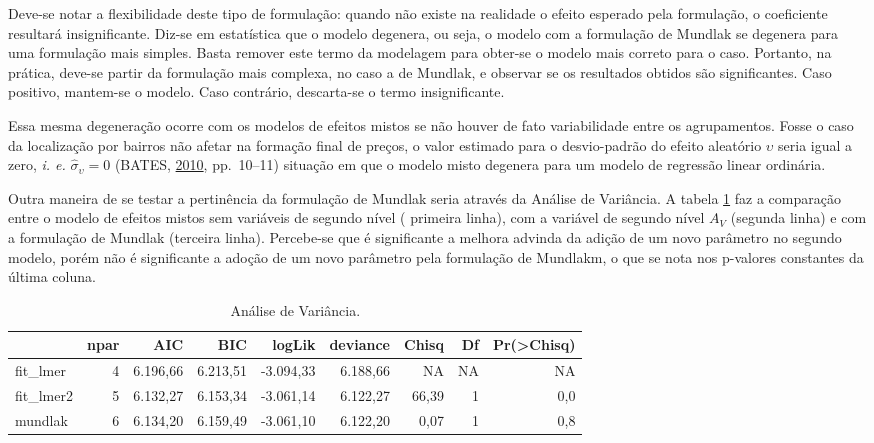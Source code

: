 \documentclass[
  a4paper, 11pt]{article}
\begin{document}
Deve-se notar a flexibilidade deste tipo de formulação: quando não
existe na realidade o efeito esperado pela formulação, o coeficiente
resultará insignificante. Diz-se em estatística que o modelo degenera,
ou seja, o modelo com a formulação de Mundlak se degenera para uma
formulação mais simples. Basta remover este termo da modelagem para
obter-se o modelo mais correto para o caso. Portanto, na prática,
deve-se partir da formulação mais complexa, no caso a de Mundlak, e
observar se os resultados obtidos são significantes. Caso positivo,
mantem-se o modelo. Caso contrário, descarta-se o termo insignificante.

Essa mesma degeneração ocorre com os modelos de efeitos mistos se não
houver de fato variabilidade entre os agrupamentos. Fosse o caso da
localização por bairros não afetar na formação final de preços, o valor
estimado para o desvio-padrão do efeito aleatório \(\upsilon\) seria
igual a zero, \emph{i. e.} \(\hat \sigma_\upsilon = 0\) (BATES,
\protect\hyperlink{ref-Batesbook}{2010}, pp.~10--11) situação em que o
modelo misto degenera para um modelo de regressão linear ordinária.

Outra maneira de se testar a pertinência da formulação de Mundlak seria
através da Análise de Variância. A tabela \ref{tab:anova} faz a
comparação entre o modelo de efeitos mistos sem variáveis de segundo
nível ( primeira linha), com a variável de segundo nível \(A_V\)
(segunda linha) e com a formulação de Mundlak (terceira linha).
Percebe-se que é significante a melhora advinda da adição de um novo
parâmetro no segundo modelo, porém não é significante a adoção de um
novo parâmetro pela formulação de Mundlakm, o que se nota nos p-valores
constantes da última coluna.

\begin{table}

\caption{\label{tab:anova}Análise de Variância.}
\centering
\begin{tabular}[t]{lrrrrrrrr}
\toprule
  & npar & AIC & BIC & logLik & deviance & Chisq & Df & Pr(>Chisq)\\
\midrule
\rowcolor{gray!6}  fit\_lmer & 4 & 6.196,66 & 6.213,51 & -3.094,33 & 6.188,66 & NA & NA & NA\\
fit\_lmer2 & 5 & 6.132,27 & 6.153,34 & -3.061,14 & 6.122,27 & 66,39 & 1 & 0,0\\
\rowcolor{gray!6}  mundlak & 6 & 6.134,20 & 6.159,49 & -3.061,10 & 6.122,20 & 0,07 & 1 & 0,8\\
\bottomrule
\end{tabular}
\end{table}
\end{document}
